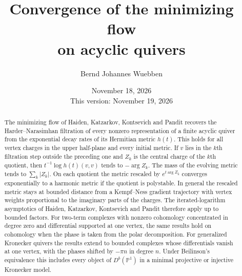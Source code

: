 \documentclass[11pt]{amsart}
\title[The minimizing flow on acyclic quivers]{Convergence of the
minimizing flow\\ on acyclic quivers}
\author{Bernd Johannes Wuebben}
\date{November 18, 2026\\This version: November 19, 2026}
\theoremstyle{definition}
\theoremstyle{remark}
\begin{document}
\begin{abstract}
The minimizing flow of Haiden, Katzarkov, Kontsevich and Pandit recovers
the Harder--Narasimhan filtration of every nonzero representation of a
finite acyclic quiver from the exponential decay rates of its Hermitian
metric $h(t)$. This holds for all vertex charges in the upper half-plane and every
initial metric. If $v$ lies in the $k$th filtration step outside the
preceding one and $Z_k$ is the central charge of the $k$th quotient, then
$t^{-1}\log h(t)(v,v)$ tends to $-\arg Z_k$. The mass of the evolving metric tends to
$\sum_k|Z_k|$. On each quotient the metric rescaled by $e^{t\arg Z_k}$
converges exponentially to a harmonic metric if the quotient is polystable.
In general the rescaled metric stays at bounded distance from a
Kempf--Ness gradient trajectory with vertex weights proportional to the
imaginary parts of the charges. The iterated-logarithm asymptotics of
Haiden, Katzarkov, Kontsevich and Pandit therefore apply up to bounded
factors. For two-term complexes with nonzero cohomology concentrated in
degree zero and differential supported at one vertex, the same results
hold on cohomology when the phase is taken from the polar decomposition.
For generalized Kronecker quivers the results extend to bounded complexes
whose differentials vanish at one vertex, with the phases shifted by
$-\pi n$ in degree $n$.
Under Beilinson's equivalence this includes every object of
$D^b(\mathbb P^1)$ in a minimal projective or injective Kronecker model.
\end{abstract}
\maketitle









\end{document}

